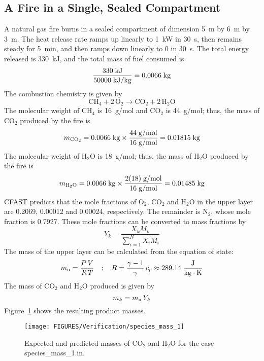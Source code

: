 \subsection{A Fire in a Single, Sealed Compartment}
\label{sec:spec1}
A natural gas fire burns in a sealed compartment of dimension 5~m by 6~m by 3~m. The heat release rate ramps up linearly to 1~kW in 30~s, then remains steady for 5~min, and then ramps down linearly to 0 in 30~s. The total energy released is 330~kJ, and the total mass of fuel consumed is
\begin{equation}
  \frac{ 330 \; {\rm kJ} }{ 50000 \; {\rm kJ/kg} } = 0.0066 \; {\rm kg}
\end{equation}
The combustion chemistry is given by
\begin{equation}
   \mathrm{CH_4 + 2 \, O_2 \to CO_2 + 2 \, H_2O}
\end{equation}
The molecular weight of CH$_4$ is 16~g/mol and CO$_2$ is 44~g/mol; thus, the mass of CO$_2$ produced by the fire is
\begin{equation}
   m_{\rm CO_2} = 0.0066 \; {\rm kg} \times  \frac{ 44 \; {\rm g/mol} }{ 16 \; {\rm g/mol} } = 0.01815 \; {\rm kg}
\end{equation}
The molecular weight of H$_2$O is 18~g/mol; thus, the mass of H$_2$O produced by the fire is
\begin{equation}
   m_{\rm H_2O} = 0.0066 \; {\rm kg} \times  \frac{ 2(18) \; {\rm g/mol} }{ 16 \; {\rm g/mol} } = 0.01485 \; {\rm kg}
\end{equation}
CFAST predicts that the mole fractions of O$_2$, CO$_2$ and H$_2$O in the upper layer are 0.2069, 0.00012 and 0.00024, respectively. The remainder is N$_2$, whose mole fraction is 0.7927. These mole fractions can be converted to mass fractions by
\begin{equation}
Y_k = \frac{X_{k} M_{k}}{\sum_{i=1}^N X_{i}M_{i}}
\end{equation}
The mass of the upper layer can be calculated from the equation of state:
\begin{equation}
m_{\rm u} = \frac{P \, V}{R \, T} \quad ; \quad R = \frac{\gamma-1}{\gamma} \, c_p \approx 289.14 \; {\rm  \frac{J}{kg \cdot K}}
\end{equation}
The mass of CO$_2$ and H$_2$O produced is given by
\begin{equation}
m_{k} = m_{\rm u} \, Y_{k}
\end{equation}
Figure~\ref{specmass1} shows the resulting product masses.

\begin{figure}[!ht]
\centering
\texttt{[image: FIGURES/Verification/species\_mass\_1]}
\caption[Results of the test case {\ct species\_mass\_1.in}]{Expected and predicted masses of CO$_2$ and H$_2$O for the case {\ct species\_mass\_1.in}.}
\label{specmass1}
\end{figure}


